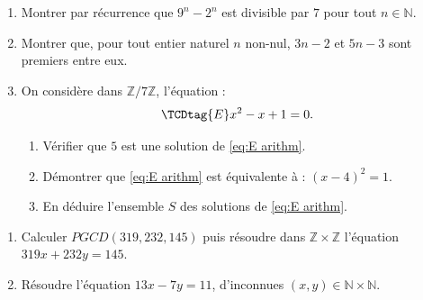 \begin{exo}\label{exo:arith-22}
      \begin{enumerate}
            \item Montrer par r\'ecurrence que $9^n - 2^n$ est divisible par $7$ pour tout $n \in \mathbb{N}$.
            \item Montrer que, pour tout entier naturel $n$ non-nul, $3n-2$ et $5n-3$ sont premiers entre eux.
            \item On consid\`ere dans $\mathbb{Z} / 7 \mathbb{Z}$, l'\'equation : 
                  \begin{equation}
                  \TCDtag{E}
                        x^2 - x + 1  = 0 .
                  \label{eq:E arithm}
                  \end{equation}
                  \begin{enumerate}
                        \item V\'erifier que $5$ est une solution de \eqref{eq:E arithm}.
                        \item D\'emontrer que \eqref{eq:E arithm} est \'equivalente \`a : 
                              $(x-4)^2 = 1$.
                        \item En d\'eduire l'ensemble $S$ des solutions de \eqref{eq:E arithm}.
                  \end{enumerate}
      \end{enumerate}
\end{exo}
%
\begin{exo}\label{exo:arith-23}
      \begin{enumerate}
            \item Calculer $PGCD(319,232,145)$ puis r\'esoudre dans $\mathbb{Z} \times \mathbb{Z}$
                  l'\'equation $319 x + 232 y = 145$.
            \item R\'esoudre l'\'equation $13x - 7 y = 11$,
                  d'inconnues $(x,y) \in \mathbb{N} \times \mathbb{N}$.
      \end{enumerate}
\end{exo}

